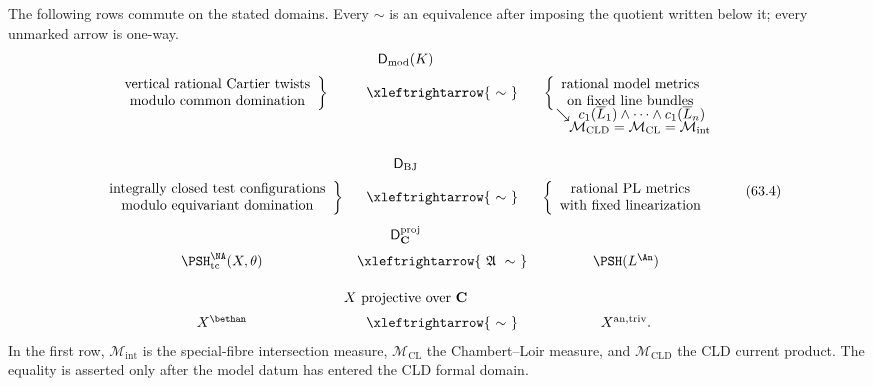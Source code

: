 \begin{theorem}\label{thm:dict-master-diagram}
The following rows commute on the stated domains.
Every $\sim$ is an equivalence after imposing the quotient written below
it; every unmarked arrow is one-way.
\[
\begin{array}{c@{\quad}c@{\quad}c}
\multicolumn{3}{c}{\mathsf D_{\mathrm{mod}}(K)}\\[2mm]
\left.
 \begin{array}{c}
 \text{vertical rational Cartier twists}\\
 \text{modulo common domination}
 \end{array}
\right\}
&\xleftrightarrow{\ \sim\ }&
\left\{
 \begin{array}{c}
 \text{rational model metrics}\\
 \text{on fixed line bundles}
 \end{array}
\right.
\\[-1mm]
&&\ \ \searrow\ c_1(\overline L_1)\wedge\cdots\wedge
                 c_1(\overline L_n)
\\[-1mm]
&&\qquad \mathcal M_{\mathrm{CLD}}
       =\mathcal M_{\mathrm{CL}}
       =\mathcal M_{\mathrm{int}}
\\[5mm]
\multicolumn{3}{c}{\mathsf D_{\mathrm{BJ}}}\\[2mm]
\left.
 \begin{array}{c}
 \text{integrally closed test configurations}\\
 \text{modulo equivariant domination}
 \end{array}
\right\}
&\xleftrightarrow{\ \sim\ }&
\left\{
 \begin{array}{c}
 \text{rational PL metrics}\\
 \text{with fixed linearization}
 \end{array}
\right.
\\[5mm]
\multicolumn{3}{c}{\mathsf D_{\mathbf C}^{\mathrm{proj}}}\\[2mm]
\PSH^{\NA}_{\mathrm{tc}}(X,\theta)
&\xleftrightarrow{\ \mathfrak A\ \sim\ }&
\PSH(L^{\An})
\\[5mm]
\multicolumn{3}{c}{X\text{ projective over }\mathbf C}\\[2mm]
X^\bethan
&\xleftrightarrow{\ \sim\ }&
X^{\mathrm{an,triv}}.
\end{array}
\tag{63.4}\label{eq:dict-master-diagram}
\]
In the first row, $\mathcal M_{\mathrm{int}}$ is the special-fibre
intersection measure, $\mathcal M_{\mathrm{CL}}$ the
Chambert--Loir measure, and $\mathcal M_{\mathrm{CLD}}$ the CLD current
product.
The equality is asserted only after the model datum has entered the CLD
formal domain.
\end{theorem}

